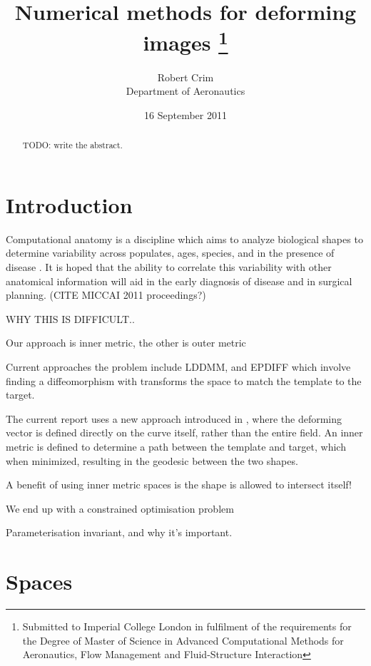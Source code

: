 \documentclass[a4paper, 10pt]{article}
\begin{document}
\author{Robert Crim \\ Department of Aeronautics}
\date{16 September 2011}
\title{Numerical methods for deforming images
\thanks{Submitted to Imperial College London in fulfilment of the requirements for the Degree of Master of Science in Advanced Computational Methods for Aeronautics, Flow Management and Fluid-Structure Interaction}}

\maketitle
\newpage
\begin{abstract}
TODO: write the abstract.
\end{abstract}
\newpage
\tableofcontents
\newpage


\section{Introduction}


 Computational anatomy is a discipline which aims to analyze biological shapes to determine variability across populates, ages, species, and in the presence of disease \cite{miller2009emerging}. It is hoped that the ability to correlate this variability with other anatomical information will aid in the early diagnosis of disease and in surgical planning. (CITE MICCAI 2011 proceedings?)

WHY THIS IS DIFFICULT..

Our approach is inner metric, the other is outer metric

Current approaches the problem include LDDMM, and EPDIFF  \cite{cotter2006singular, cotter2009curves} which involve finding a diffeomorphism with transforms the space to match the template to the target. 

The current report uses a new approach introduced in \cite{bauer2011new}, where the deforming vector is defined directly on the curve itself, rather than the entire field. An inner metric is defined to determine a path between the template and target, which when minimized, resulting in the geodesic between the two shapes.

A benefit of using inner metric spaces is the shape is allowed to intersect itself!

We end up with a constrained optimisation problem

Parameterisation invariant, and why it's important.


\section{Spaces}
\end{document}
